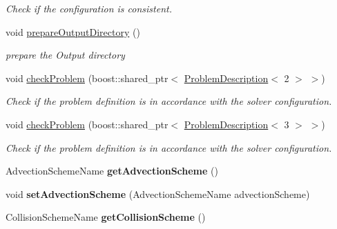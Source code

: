 \begin{DoxyCompactItemize}
\begin{DoxyCompactList}\small\item\em Check if the configuration is consistent. \item\end{DoxyCompactList}\item 
void \hyperlink{classnatrium_1_1SolverConfiguration_a69c009fd87690677b66ab10a000d07f6}{prepareOutputDirectory} ()
\begin{DoxyCompactList}\small\item\em prepare the Output directory \item\end{DoxyCompactList}\item 
void \hyperlink{classnatrium_1_1SolverConfiguration_a368a252965c1b23f7ad6811fdd0adcd4}{checkProblem} (boost::shared\_\-ptr$<$ \hyperlink{classnatrium_1_1ProblemDescription}{ProblemDescription}$<$ 2 $>$ $>$)
\begin{DoxyCompactList}\small\item\em Check if the problem definition is in accordance with the solver configuration. \item\end{DoxyCompactList}\item 
void \hyperlink{classnatrium_1_1SolverConfiguration_a3c66c7b0c5de2bee900835931c50ed5a}{checkProblem} (boost::shared\_\-ptr$<$ \hyperlink{classnatrium_1_1ProblemDescription}{ProblemDescription}$<$ 3 $>$ $>$)
\begin{DoxyCompactList}\small\item\em Check if the problem definition is in accordance with the solver configuration. \item\end{DoxyCompactList}\item 
\hypertarget{classnatrium_1_1SolverConfiguration_aaf32180358f99d78d56b3435dff11a11}{
AdvectionSchemeName {\bfseries getAdvectionScheme} ()}
\label{classnatrium_1_1SolverConfiguration_aaf32180358f99d78d56b3435dff11a11}

\item 
\hypertarget{classnatrium_1_1SolverConfiguration_a4fef165cd5a17247203af08846ec0f31}{
void {\bfseries setAdvectionScheme} (AdvectionSchemeName advectionScheme)}
\label{classnatrium_1_1SolverConfiguration_a4fef165cd5a17247203af08846ec0f31}

\item 
\hypertarget{classnatrium_1_1SolverConfiguration_a90e61c6fa9387a1cbf5943674bf307a8}{
CollisionSchemeName {\bfseries getCollisionScheme} ()}
\label{classnatrium_1_1SolverConfiguration_a90e61c6fa9387a1cbf5943674bf307a8}


\end{DoxyCompactItemize}
